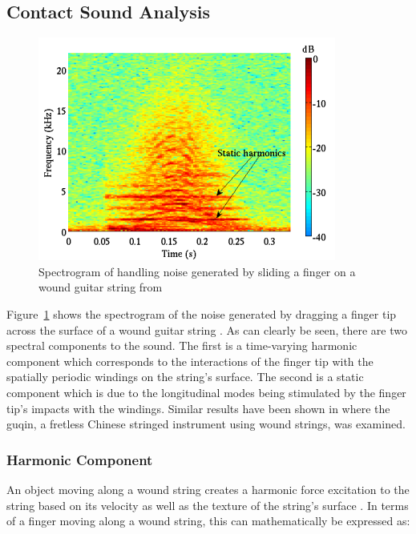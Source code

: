 \documentclass[main.tex]{subfiles}
\begin{document}
\subsection{Contact Sound Analysis}
\begin{figure}[h]
    \centering
    \includegraphics[scale=1]{./images/pictures/finger-noise-spectrogram.png}
    \caption{Spectrogram of handling noise generated by sliding a finger on a wound guitar string from }
    \label{fig:finger_noise_spectrogram}
\end{figure}

Figure~\ref{fig:finger_noise_spectrogram} shows the spectrogram of the noise generated by dragging a finger tip across the surface of a wound guitar string . As can clearly be seen, there are two spectral components to the sound. The first is a time-varying harmonic component which corresponds to the interactions of the finger tip with the spatially periodic windings on the string's surface. The second is a static component which is due to the longitudinal modes being stimulated by the finger tip's impacts with the windings. Similar results have been shown in  where the guqin, a fretless Chinese stringed instrument using wound strings, was examined.

\subsubsection{Harmonic Component}
An object moving along a wound string creates a harmonic force excitation to the string based on its velocity as well as the texture of the string's surface . In terms of a finger moving along a wound string, this can mathematically be expressed as:
\end{document}
